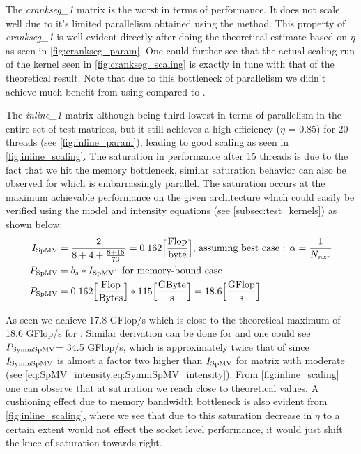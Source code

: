  The \emph{crankseg\_1} matrix is the worst in terms of performance. It does not scale well due to it's limited parallelism obtained using the \RACE method. This property of \emph{crankseg\_1} is well evident directly after doing the theoretical estimate based on $\eta$ as  seen in \cref{fig:crankseg_param}. One could further see that the actual scaling run of the kernel seen in \cref{fig:crankseg_scaling} is exactly in tune with that of the theoretical result. Note that due to this bottleneck of parallelism we didn't achieve much benefit from using \SymmSpmv compared to \SpMV.

The \emph{inline\_1} matrix although being third lowest in terms of parallelism in the entire set of test matrices, but it still achieves a high efficiency ($\eta$ = 0.85) for 20 threads (see \cref{fig:inline_param}), leading to good scaling as seen in \cref{fig:inline_scaling}. The saturation in performance after 15 threads is due to the fact that we hit the memory bottleneck, similar saturation behavior can also be observed for \SpMV which is embarrassingly parallel. The saturation occurs at the maximum achievable performance on the given architecture which could easily be verified using the \roofline model \cite{Williams_roofline} and intensity equations (see \cref{subsec:test_kernels}) as shown below:
\begin{align*}
	 I_\mathrm{SpMV} &= \frac{2}{8+4+\frac{8+16}{73}} = 0.162 \Big[\frac{\mbox{Flop}}{\mbox{byte}}\Big] \text{, assuming best case : $\alpha = \frac{1}{N_{nzr}}$}\\
	 P_\mathrm{SpMV} &= b_s*I_\mathrm{SpMV}; \text{  for memory-bound case}\\
	 P_\mathrm{SpMV} &= 0.162\Big[\frac{\mbox{Flop}}{\mbox{Bytes}}\Big]*115\Big[\frac{\mbox{GByte}}{\mbox{s}}\Big] = 18.6 \Big[\frac{\mbox{GFlop}}{\mbox{s}}\Big]\\
\end{align*}

As seen we achieve 17.8 GFlop/s which is close to the theoretical maximum of 18.6 GFlop/s for \SpMV. Similar derivation can be done for \SymmSpmv and one could see $P_\mathrm{SymmSpMV}$= 34.5 GFlop/s, which is approximately twice that of \SpMV since $I_\mathrm{SymmSpMV}$ is almost a factor two higher than $I_\mathrm{SpMV}$ for matrix with moderate \NNZR (see \cref{eq:SpMV_intensity,eq:SymmSpMV_intensity}). From \cref{fig:inline_scaling} one can observe that at saturation we reach close to theoretical values. A cushioning effect due to memory bandwidth bottleneck is also evident from \cref{fig:inline_scaling}, where we see that due to this saturation decrease in $\eta$ to a certain extent would not effect the socket level performance, it would just shift the knee of saturation towards right.

